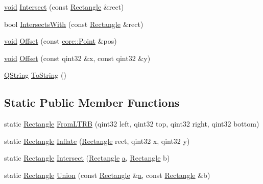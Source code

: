 \begin{DoxyCompactItemize}
\item 
\hyperlink{group___u_a_v_objects_plugin_ga444cf2ff3f0ecbe028adce838d373f5c}{void} \hyperlink{group___o_p_map_widget_ga1eacc8faeb8cf4c202dc6eb3a2cd7482}{\-Intersect} (const \hyperlink{structinternals_1_1_rectangle}{\-Rectangle} \&rect)
\item 
bool \hyperlink{group___o_p_map_widget_gae5e839ee40fb95a93687ee17445de718}{\-Intersects\-With} (const \hyperlink{structinternals_1_1_rectangle}{\-Rectangle} \&rect)
\item 
\hyperlink{group___u_a_v_objects_plugin_ga444cf2ff3f0ecbe028adce838d373f5c}{void} \hyperlink{group___o_p_map_widget_ga66c531d30a3208df417c71ee0cb3ce72}{\-Offset} (const \hyperlink{structcore_1_1_point}{core\-::\-Point} \&pos)
\item 
\hyperlink{group___u_a_v_objects_plugin_ga444cf2ff3f0ecbe028adce838d373f5c}{void} \hyperlink{group___o_p_map_widget_gaa8fc3eba71f76d8e6264cd610bb11952}{\-Offset} (const qint32 \&x, const qint32 \&y)
\item 
\hyperlink{group___u_a_v_objects_plugin_gab9d252f49c333c94a72f97ce3105a32d}{\-Q\-String} \hyperlink{group___o_p_map_widget_gacc8a6c81527141fc59b3ba245b35c297}{\-To\-String} ()
\end{DoxyCompactItemize}
\subsection*{\-Static \-Public \-Member \-Functions}
\begin{DoxyCompactItemize}
\item 
static \hyperlink{structinternals_1_1_rectangle}{\-Rectangle} \hyperlink{group___o_p_map_widget_gabe5c3b8c9edda8d902d997d47d9dc795}{\-From\-L\-T\-R\-B} (qint32 left, qint32 top, qint32 right, qint32 bottom)
\item 
static \hyperlink{structinternals_1_1_rectangle}{\-Rectangle} \hyperlink{group___o_p_map_widget_ga2968ca81b2ca433a710253f3c6168d36}{\-Inflate} (\hyperlink{structinternals_1_1_rectangle}{\-Rectangle} rect, qint32 x, qint32 y)
\item 
static \hyperlink{structinternals_1_1_rectangle}{\-Rectangle} \hyperlink{group___o_p_map_widget_ga6d1eb93d1aabfc6ef4c65cf4e81ea6c2}{\-Intersect} (\hyperlink{structinternals_1_1_rectangle}{\-Rectangle} \hyperlink{_o_p_plots_8m_ab6991d210d93a78cdbdf6de1889c1259}{a}, \hyperlink{structinternals_1_1_rectangle}{\-Rectangle} b)
\item 
static \hyperlink{structinternals_1_1_rectangle}{\-Rectangle} \hyperlink{group___o_p_map_widget_ga9a93d2cc4abc1f3c2b053dca4311fd33}{\-Union} (const \hyperlink{structinternals_1_1_rectangle}{\-Rectangle} \&\hyperlink{_o_p_plots_8m_ab6991d210d93a78cdbdf6de1889c1259}{a}, const \hyperlink{structinternals_1_1_rectangle}{\-Rectangle} \&b)
\end{DoxyCompactItemize}
